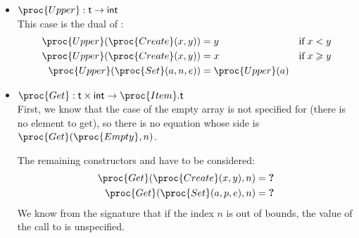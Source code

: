 \begin{itemize}
  \item \(\proc{Upper} : \type{t} \rightarrow \type{int}\)\\
  This case is the dual of :
  \begin{align}
       \proc{Upper} (\proc{Create} (x, y))
    &= y
    &  \text{if} \;x < y \label{Upper_1}\\
       \proc{Upper} (\proc{Create} (x, y))
    &= x
    &  \text{if} \;x \geqslant y \label{Upper_2}\\
       \proc{Upper} (\proc{Set} (a, n, e))
    &= \proc{Upper} (a) \label{Upper_3}
  \end{align}

  \item \(\proc{Get} : \type{t} \times \type{int} \rightarrow
    \proc{Item}.\type{t}\)\\
  First, we know that the case of the empty array is not specified for
   (there is no element to get), so there is no equation
  whose side is \(\proc{Get} (\proc{Empty}, n)\).

  The remaining constructors  and  have to be
  considered:
  \begin{align}
     \proc{Get} (\proc{Create} (x, y), n)
  &= \textbf{?} \label{Get_1}\\
     \proc{Get} (\proc{Set} (a, p, e), n)
  &= \textbf{?} \label{Get_2}
  \end{align}
  We know from the signature that if the index \(n\) is out of
  bounds, the value of the call to  is unspecified.


\end{itemize}
